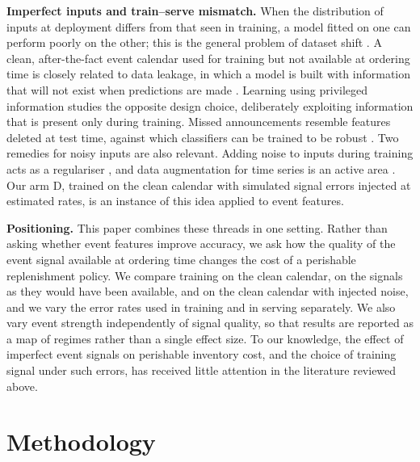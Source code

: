 \textbf{Imperfect inputs and train--serve mismatch.} When the distribution of inputs at deployment differs from that seen in training, a model fitted on one can perform poorly on the other; this is the general problem of dataset shift \cite{quinonero2009dataset}. A clean, after-the-fact event calendar used for training but not available at ordering time is closely related to data leakage, in which a model is built with information that will not exist when predictions are made \cite{kaufman2012leakage}. Learning using privileged information \cite{vapnik2009new} studies the opposite design choice, deliberately exploiting information that is present only during training. Missed announcements resemble features deleted at test time, against which classifiers can be trained to be robust \cite{globerson2006nightmare}. Two remedies for noisy inputs are also relevant. Adding noise to inputs during training acts as a regulariser \cite{bishop1995training}, and data augmentation for time series is an active area \cite{wen2021time}. Our arm D, trained on the clean calendar with simulated signal errors injected at estimated rates, is an instance of this idea applied to event features.

\textbf{Positioning.} This paper combines these threads in one setting. Rather than asking whether event features improve accuracy, we ask how the quality of the event signal available at ordering time changes the cost of a perishable replenishment policy. We compare training on the clean calendar, on the signals as they would have been available, and on the clean calendar with injected noise, and we vary the error rates used in training and in serving separately. We also vary event strength independently of signal quality, so that results are reported as a map of regimes rather than a single effect size. To our knowledge, the effect of imperfect event signals on perishable inventory cost, and the choice of training signal under such errors, has received little attention in the literature reviewed above.

\section{Methodology}
\label{sec:method}

